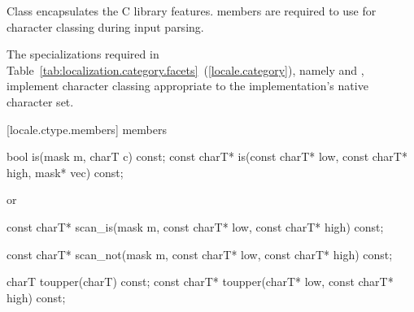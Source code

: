 \pnum
Class
encapsulates the C library
features.
members are required to use
for character classing during input parsing.

\pnum
The specializations required in Table~\ref{tab:localization.category.facets}~(\ref{locale.category}), namely
and
,
implement character classing appropriate
to the implementation's native character set.

[locale.ctype.members]{ members}

%
%
\begin{itemdecl}
bool         is(mask m, charT c) const;
const charT* is(const charT* low, const charT* high,
                mask* vec) const;
\end{itemdecl}

\begin{itemdescr}
\pnum
\returns
{}
or
\end{itemdescr}

%
%
\begin{itemdecl}
const charT* scan_is(mask m,
                     const charT* low, const charT* high) const;
\end{itemdecl}

\begin{itemdescr}
\pnum
\returns
{}
\end{itemdescr}

%
%
\begin{itemdecl}
const charT* scan_not(mask m,
                      const charT* low, const charT* high) const;
\end{itemdecl}

\begin{itemdescr}
\pnum
\returns
{}
\end{itemdescr}

%
%
\begin{itemdecl}
charT        toupper(charT) const;
const charT* toupper(charT* low, const charT* high) const;
\end{itemdecl}

